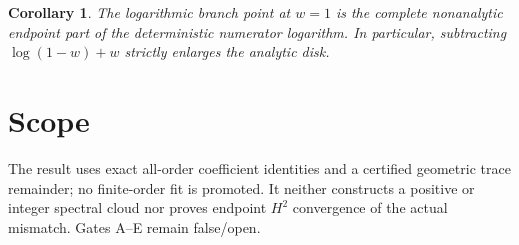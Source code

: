 \documentclass[11pt]{article}
\newtheorem{corollary}[theorem]{Corollary}
\theoremstyle{remark}\newtheorem{remark}[theorem]{Remark}
\begin{document}
\begin{corollary}
The logarithmic branch point at $w=1$ is the complete nonanalytic endpoint
part of the deterministic numerator logarithm.  In particular, subtracting
$\log(1-w)+w$ strictly enlarges the analytic disk.
\end{corollary}

\section{Scope}
The result uses exact all-order coefficient identities and a certified
geometric trace remainder; no finite-order fit is promoted.  It neither
constructs a positive or integer spectral cloud nor proves endpoint $H^2$
convergence of the actual mismatch.  Gates A--E remain false/open.
\end{document}
